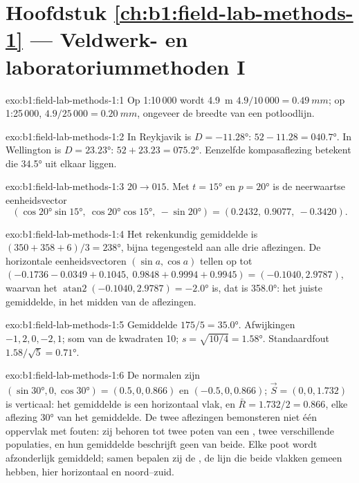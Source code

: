 \section*{Hoofdstuk \ref{ch:b1:field-lab-methods-1} --- Veldwerk- en laboratoriummethoden I}

\begin{solution}{exo:b1:field-lab-methods-1:1}
Op 1:10\,000 wordt \qty{4.9}{m} $4.9/10\,000 = \qty{0.49}{mm}$; op
1:25\,000, $4.9/25\,000 = \qty{0.20}{mm}$, ongeveer de breedte van een potloodlijn.
\end{solution}

\begin{solution}{exo:b1:field-lab-methods-1:2}
In Reykjavik is $D = \ang{-11.28}$: $52 - 11.28 = \ang{040.7}$. In Wellington is
$D = \ang{+23.23}$: $52 + 23.23 = \ang{075.2}$. Eenzelfde kompasaflezing betekent  die
\ang{34.5} uit elkaar liggen.
\end{solution}

\begin{solution}{exo:b1:field-lab-methods-1:3}
$20\to015$. Met $t = \ang{15}$ en $p = \ang{20}$ is de neerwaartse eenheidsvector
\[
  (\cos\ang{20}\sin\ang{15},\ \cos\ang{20}\cos\ang{15},\ -\sin\ang{20}) =
  (0.2432,\ 0.9077,\ -0.3420).
\]
\end{solution}

\begin{solution}{exo:b1:field-lab-methods-1:4}
Het rekenkundig gemiddelde is $(350 + 358 + 6)/3 = \ang{238}$, bijna tegengesteld aan alle drie
aflezingen. De horizontale eenheidsvectoren $(\sin a, \cos a)$ tellen op tot
$(-0.1736 - 0.0349 + 0.1045,\ 0.9848 + 0.9994 + 0.9945) = (-0.1040, 2.9787)$,
waarvan het  $\operatorname{atan2}(-0.1040, 2.9787) = \ang{-2.0}$ is, dat is
\ang{358.0}: het juiste gemiddelde, in het midden van de aflezingen.
\end{solution}

\begin{solution}{exo:b1:field-lab-methods-1:5}
Gemiddelde $175/5 = \ang{35.0}$. Afwijkingen $-1, 2, 0, -2, 1$; som van de kwadraten 10;
$s = \sqrt{10/4} = \ang{1.58}$. Standaardfout $1.58/\sqrt5 = \ang{0.71}$.
\end{solution}

\begin{solution}{exo:b1:field-lab-methods-1:6}
De normalen zijn $(\sin\ang{30}, 0, \cos\ang{30}) = (0.5, 0, 0.866)$ en
$(-0.5, 0, 0.866)$; $\vec S = (0, 0, 1.732)$ is verticaal: het gemiddelde is een horizontaal vlak, en
$\bar R = 1.732/2 = 0.866$, elke aflezing \ang{30} van het gemiddelde. De twee aflezingen bemonsteren niet
één oppervlak met fouten: zij behoren tot twee poten van een , twee verschillende populaties, en hun
gemiddelde beschrijft geen van beide. Elke poot wordt afzonderlijk gemiddeld; samen bepalen zij de ,
de lijn die beide vlakken gemeen hebben, hier horizontaal en noord--zuid.
\end{solution}

